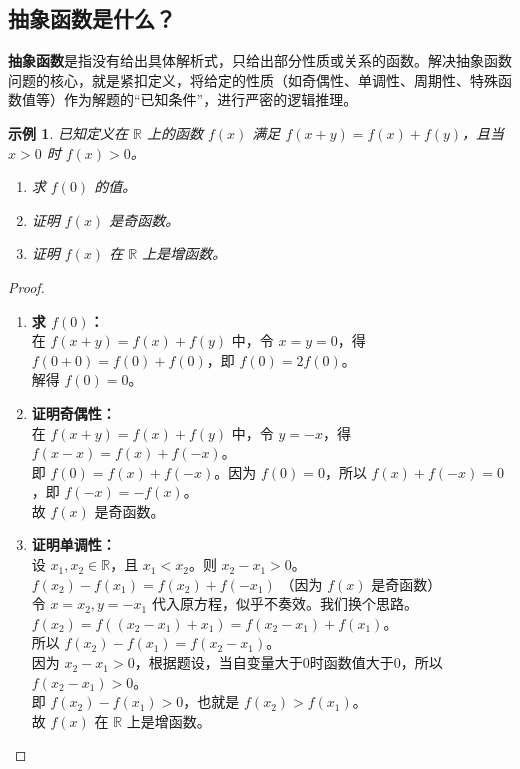 \documentclass[a4paper,12pt]{ctexart}
\theoremstyle{mytheoremstyle}
\newtheorem{example}{示例}[section]
\begin{document}
\subsection{抽象函数是什么？}
\textbf{抽象函数}是指没有给出具体解析式，只给出部分性质或关系的函数。解决抽象函数问题的核心，就是紧扣定义，将给定的性质（如奇偶性、单调性、周期性、特殊函数值等）作为解题的“已知条件”，进行严密的逻辑推理。

\begin{example}
    已知定义在 $\mathbb{R}$ 上的函数 $f(x)$ 满足 $f(x+y) = f(x)+f(y)$，且当 $x>0$ 时 $f(x)>0$。
    \begin{enumerate}
        \item 求 $f(0)$ 的值。
        \item 证明 $f(x)$ 是奇函数。
        \item 证明 $f(x)$ 在 $\mathbb{R}$ 上是增函数。
    \end{enumerate}
\end{example}
\begin{proof}
    \begin{enumerate}
        \item \textbf{求 $f(0)$：} \\
              在 $f(x+y) = f(x)+f(y)$ 中，令 $x=y=0$，得 $f(0+0) = f(0)+f(0)$，即 $f(0)=2f(0)$。\\
              解得 $f(0) = 0$。
        \item \textbf{证明奇偶性：} \\
              在 $f(x+y) = f(x)+f(y)$ 中，令 $y=-x$，得 $f(x-x) = f(x)+f(-x)$。\\
              即 $f(0) = f(x)+f(-x)$。因为 $f(0)=0$，所以 $f(x)+f(-x)=0$，即 $f(-x)=-f(x)$。\\
              故 $f(x)$ 是奇函数。
        \item \textbf{证明单调性：} \\
              设 $x_1, x_2 \in \mathbb{R}$，且 $x_1 < x_2$。则 $x_2 - x_1 > 0$。\\
              $f(x_2) - f(x_1) = f(x_2) + f(-x_1)$ （因为 $f(x)$ 是奇函数） \\
              令 $x=x_2, y=-x_1$ 代入原方程，似乎不奏效。我们换个思路。\\
              $f(x_2) = f((x_2-x_1)+x_1) = f(x_2-x_1) + f(x_1)$。\\
              所以 $f(x_2) - f(x_1) = f(x_2-x_1)$。\\
              因为 $x_2-x_1 > 0$，根据题设，当自变量大于0时函数值大于0，所以 $f(x_2-x_1) > 0$。\\
              即 $f(x_2) - f(x_1) > 0$，也就是 $f(x_2) > f(x_1)$。\\
              故 $f(x)$ 在 $\mathbb{R}$ 上是增函数。
    \end{enumerate}
\end{proof}
\end{document}
